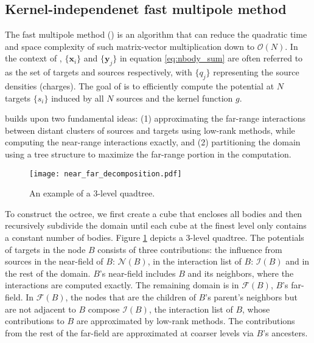 \subsection{Kernel-independenet fast multipole method}

The fast multipole method (\fmm) is an algorithm that can reduce the quadratic time and space complexity of such matrix-vector multiplication down to $\mathcal{O}(N)$.
In the context of \fmm, $\{\mathbf{x}_i\}$ and $\{\mathbf{y}_j\}$ in equation \ref{eq:nbody_sum} are often referred to as the set of targets and sources respectively, with $\{q_j\}$ representing the source densities (charges).
The goal of \fmm is to efficiently compute the potential at $N$ targets $\{s_i\}$ induced by all $N$ sources and the kernel function $g$.

\fmm builds upon two fundamental ideas: (1) approximating the far-range interactions between distant clusters of sources and targets using low-rank methods, while computing the near-range interactions exactly, and (2) partitioning the domain using a tree structure to maximize the far-range portion in the computation.

\begin{figure}
    \centering
    \texttt{[image: near\_far\_decomposition.pdf]}
    \caption{An example of a 3-level quadtree.}
    \label{fig:near_far_decomp}
\end{figure}

To construct the octree, we first create a cube that encloses all bodies and then recursively subdivide the domain until each cube at the finest level only contains a constant number of bodies.
Figure \ref{fig:near_far_decomp} depicts a 3-level quadtree.
The potentials of targets in the node $B$ consists of three contributions: the influence from sources in the near-field of $B$: $\mathcal{N}(B)$, in the interaction list of $B$: $\mathcal{I}(B)$ and in the rest of the domain.
$B$'s near-field includes $B$ and its neighbors, where the interactions are computed exactly.
The remaining domain is in $\mathcal{F}(B)$, $B$'s far-field.
In $\mathcal{F}(B)$, the nodes that are the children of $B$'s parent's neighbors but are not adjacent to $B$ compose $\mathcal{I}(B)$, the interaction list of $B$, whose contributions to $B$ are approximated by low-rank methods.
The contributions from the rest of the far-field are approximated at coarser levels via $B$'s ancesters.

